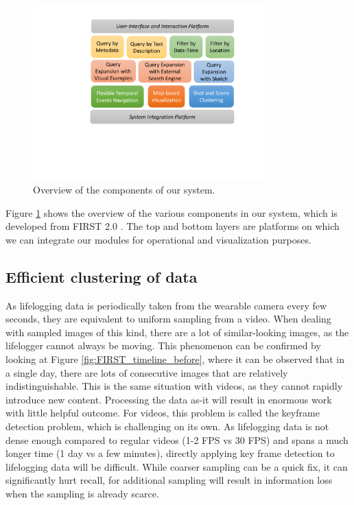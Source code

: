 \begin{figure}[h]
    \centering
    \includegraphics[width=0.8\textwidth]{content/resources/images/methods/FIRST3Components.pdf}
    \caption{Overview of the components of our system.}
    \label{fig:retrieval_components}
\end{figure}

Figure \ref{fig:retrieval_components} shows the overview of the various components in our system, which is developed from FIRST 2.0 \cite{trang-trung_flexible_2021}. The top and bottom layers are platforms on which we can integrate our modules for operational and visualization purposes.

\vspace{-2mm}
\subsection{Efficient clustering of data}
\label{sec:clustering_data}

\vspace{-2mm}
As lifelogging data is periodically taken from the wearable camera every few seconds, they are equivalent to uniform sampling from a video. When dealing with sampled images of this kind, there are a lot of similar-looking images, as the lifelogger cannot always be moving. This phenomenon can be confirmed by looking at Figure \ref{fig:FIRST_timeline_before}, where it can be observed that in a single day, there are lots of consecutive images that are relatively indistinguishable. This is the same situation with videos, as they cannot rapidly introduce new content. Processing the data as-it will result in enormous work with little helpful outcome. For videos, this problem is called the keyframe detection problem, which is challenging on its own. As lifelogging data is not dense enough compared to regular videos (1-2 FPS vs 30 FPS) and spans a much longer time (1 day vs a few minutes), directly applying key frame detection to lifelogging data will be difficult. While coarser sampling can be a quick fix, it can significantly hurt recall, for additional sampling will result in information loss when the sampling is already scarce. 

